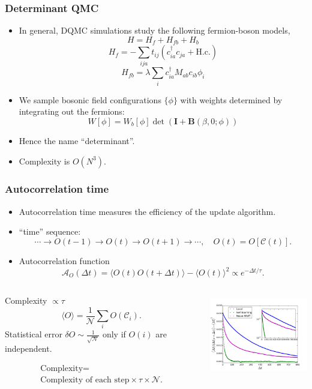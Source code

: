 \documentclass[xcolor=table, 10pt, aspectratio=43]{beamer}
\begin{document}
\begin{frame}
  \frametitle{Determinant QMC}
  \begin{itemize}
    \item In general, DQMC simulations study the following fermion-boson models,
    \[H = H_f + H_{fb} + H_b\]
    \[H_f=-\sum_{ija}t_{ij}\left(c_{ia}^\dagger c_{ja}+\text{H.c.}\right)\]
    \[H_{fb}=\lambda\sum_ic_{ia}^\dagger M_{ab}c_{ib}\phi_i\]
    \item We sample bosonic field configurations $\{\phi\}$ with weights determined by integrating out the fermions:
    \[W[\phi] = W_b[\phi]\det(\mathbf I + \mathbf B(\beta,0;\phi))\]
    \item Hence the name ``determinant''.
    \item Complexity is \alert{$O(N^3)$}.
  \end{itemize}
\end{frame}

\begin{frame}
  \frametitle{Autocorrelation time}
  \begin{itemize}
    \item Autocorrelation time measures the efficiency of the update algorithm.
    \item ``time'' sequence:
    \[\cdots\rightarrow O(t-1)\rightarrow O(t)\rightarrow O(t+1)\rightarrow\cdots,
  \quad O(t) = O[\mathcal C(t)].\]
    \item Autocorrelation function
    \[\mathcal A_O(\Delta t)=\langle O(t)O(t+\Delta t)\rangle - \langle O(t)\rangle^2\propto e^{-\Delta t/\tau}.\]
  \end{itemize}
  \begin{columns}
    \begin{block}{Complexity $\propto \tau$}
      \[\langle O\rangle = \frac1{\mathcal N}\sum_iO(\mathcal C_i).\]
      Statistical error $\delta O\sim\frac1{\sqrt{\mathcal N}}$ only if $O(i)$ are independent.

\begin{gather*}\text{Complexity}=\\\text{Complexity of each step}\times\tau\times\mathcal N.\end{gather*}
    \end{block}
    \centering
    \includegraphics[height=3.5cm]{auto_decay}
  \end{columns}
\end{frame}
\end{document}
